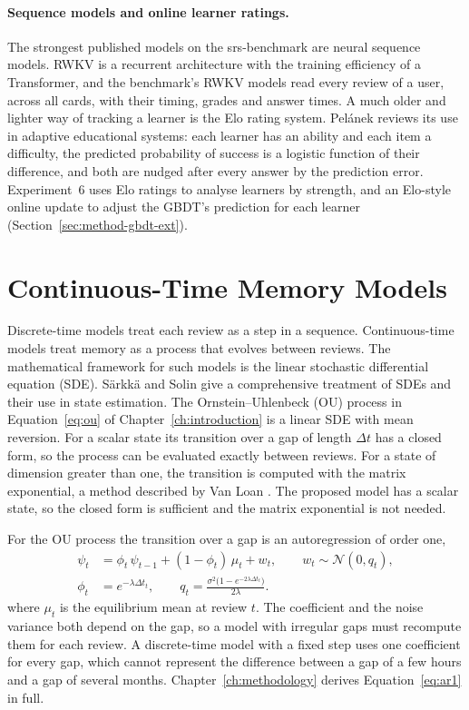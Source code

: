 \paragraph{Sequence models and online learner ratings.}
The strongest published models on the srs-benchmark are neural sequence models. RWKV \cite{peng2023rwkv} is a recurrent
architecture with the training efficiency of a Transformer, and the benchmark's RWKV models read every review of a user,
across all cards, with their timing, grades and answer times. A much older and lighter way of tracking a learner is the Elo
rating system. Pel\'anek \cite{pelanek2016elo} reviews its use in adaptive educational systems: each learner has an ability
and each item a difficulty, the predicted probability of success is a logistic function of their difference, and both are
nudged after every answer by the prediction error. Experiment~6 uses Elo ratings to analyse learners by strength, and an
Elo-style online update to adjust the GBDT's prediction for each learner (Section~\ref{sec:method-gbdt-ext}).

\section{Continuous-Time Memory Models}
\label{sec:lit-continuous}

Discrete-time models treat each review as a step in a sequence. Continuous-time models treat memory as a
process that evolves between reviews. The mathematical framework for such models is the linear
stochastic differential equation (SDE). S\"arkk\"a and Solin \cite{sarkka2019applied} give a
comprehensive treatment of SDEs and their use in state estimation. The Ornstein--Uhlenbeck (OU) process
in Equation~\eqref{eq:ou} of Chapter~\ref{ch:introduction} is a linear SDE with mean reversion. For a
scalar state its transition over a gap of length $\Delta t$ has a closed form, so the process can be
evaluated exactly between reviews. For a state of dimension greater than one, the transition is
computed with the matrix exponential, a method described by Van Loan \cite{vanloan1978computing}. The
proposed model has a scalar state, so the closed form is sufficient and the matrix exponential is not
needed.

For the OU process the transition over a gap is an autoregression of order one,
\begin{align}
  \psi_t &= \phi_t\,\psi_{t-1} + (1-\phi_t)\,\mu_t + w_t, \qquad w_t \sim \mathcal{N}(0, q_t),
  \label{eq:ar1}\\
  \phi_t &= e^{-\lambda \Delta t_t}, \qquad
  q_t = \frac{\sigma^2\bigl(1 - e^{-2\lambda \Delta t_t}\bigr)}{2\lambda}.
\end{align}
where $\mu_t$ is the equilibrium mean at review $t$. The coefficient and the noise variance both depend on
the gap, so a model with irregular gaps must recompute them for each review. A discrete-time model with a
fixed step uses one coefficient for every gap, which cannot represent the difference between a gap of a
few hours and a gap of several months. Chapter~\ref{ch:methodology} derives Equation~\eqref{eq:ar1} in full.

